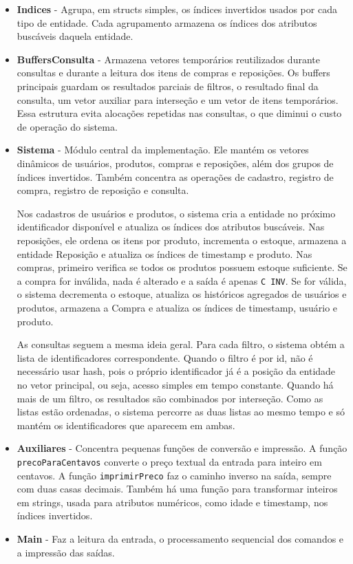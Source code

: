 \documentclass[11pt,a4paper]{article}
\begin{document}
\begin{itemize}
    \item \textbf{Indices} - Agrupa, em structs simples, os índices invertidos usados por cada tipo de entidade. Cada agrupamento armazena os índices dos atributos buscáveis daquela entidade.

    \item \textbf{BuffersConsulta} - Armazena vetores temporários reutilizados durante consultas e durante a leitura dos itens de compras e reposições. Os buffers principais guardam os resultados parciais de filtros, o resultado final da consulta, um vetor auxiliar para interseção e um vetor de itens temporários. Essa estrutura evita alocações repetidas nas consultas, o que diminui o custo de operação do sistema.

    \item \textbf{Sistema} - Módulo central da implementação. Ele mantém os vetores dinâmicos de usuários, produtos, compras e reposições, além dos grupos de índices invertidos. Também concentra as operações de cadastro, registro de compra, registro de reposição e consulta.

    Nos cadastros de usuários e produtos, o sistema cria a entidade no próximo identificador disponível e atualiza os índices dos atributos buscáveis. Nas reposições, ele ordena os itens por produto, incrementa o estoque, armazena a entidade Reposição e atualiza os índices de timestamp e produto. Nas compras, primeiro verifica se todos os produtos possuem estoque suficiente. Se a compra for inválida, nada é alterado e a saída é apenas \texttt{C INV}. Se for válida, o sistema decrementa o estoque, atualiza os históricos agregados de usuários e produtos, armazena a Compra e atualiza os índices de timestamp, usuário e produto.

    As consultas seguem a mesma ideia geral. Para cada filtro, o sistema obtém a lista de identificadores correspondente. Quando o filtro é por id, não é necessário usar hash, pois o próprio identificador já é a posição da entidade no vetor principal, ou seja, acesso simples em tempo constante. Quando há mais de um filtro, os resultados são combinados por interseção. Como as listas estão ordenadas, o sistema percorre as duas listas ao mesmo tempo e só mantém os identificadores que aparecem em ambas.

    \item \textbf{Auxiliares} - Concentra pequenas funções de conversão e impressão. A função \texttt{precoParaCentavos} converte o preço textual da entrada para inteiro em centavos. A função \texttt{imprimirPreco} faz o caminho inverso na saída, sempre com duas casas decimais. Também há uma função para transformar inteiros em strings, usada para atributos numéricos, como idade e timestamp, nos índices invertidos.

    \item \textbf{Main} - Faz a leitura da entrada, o processamento sequencial dos comandos e a impressão das saídas.
\end{itemize}
\end{document}
